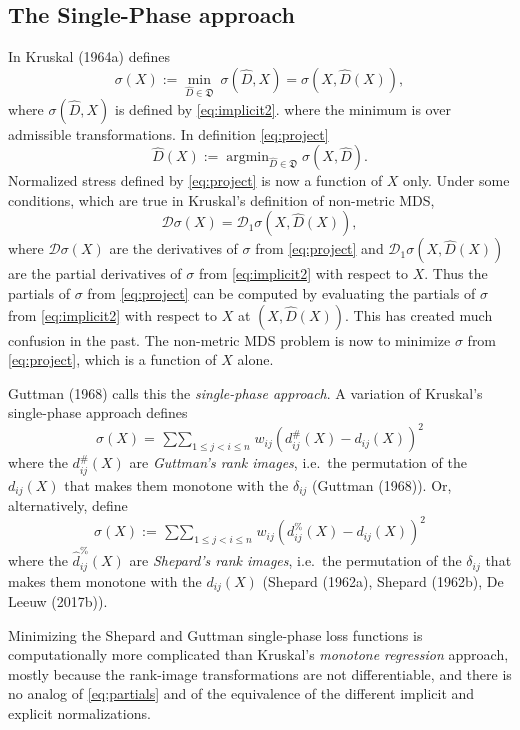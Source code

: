 \documentclass[
  12pt,
]{article}
\newcommand{\jis}{\mathop{\sum\sum}_{1\leq j<i\leq n}}
\begin{document}
\subsection{The Single-Phase approach}\label{the-single-phase-approach}

In Kruskal (1964a) defines
\begin{equation}
\sigma(X):=\min_{\hat D\in\mathfrak{D}}\ \sigma(\hat D,X)=\sigma(X,\hat D(X)),
\label{eq:project}
\end{equation}
where \(\sigma(\hat D,X)\) is defined by \eqref{eq:implicit2}.
where the minimum is over admissible transformations. In definition
\eqref{eq:project}
\begin{equation}
\hat D(X):=\mathop{\text{argmin}}_{\hat D\in\mathfrak{D}}\sigma(X, \hat D).
\label{eq:optscal}
\end{equation}
Normalized stress defined by \eqref{eq:project} is now a function of \(X\) only. Under some
conditions, which are true in Kruskal's definition of non-metric MDS,
\begin{equation}
\mathcal{D}\sigma(X)=\mathcal{D}_1\sigma(X,\hat D(X)),
\label{eq:partials}
\end{equation}
where \(\mathcal{D}\sigma(X)\) are the derivatives of \(\sigma\) from \eqref{eq:project} and \(\mathcal{D}_1\sigma(X,\hat D(X))\) are the partial derivatives of \(\sigma\) from \eqref{eq:implicit2} with respect to \(X\). Thus the partials of \(\sigma\) from \eqref{eq:project} can be computed by evaluating the partials of \(\sigma\) from \eqref{eq:implicit2} with respect to \(X\) at \((X,\hat D(X))\). This has created much confusion in the past. The non-metric MDS problem is now to minimize \(\sigma\) from \eqref{eq:project}, which is a function of \(X\) alone.

Guttman (1968) calls this the \emph{single-phase approach}. A variation of
Kruskal's single-phase approach defines
\[
\sigma(X)=\jis w_{ij}(d_{ij}^\#(X)-d_{ij}(X))^2
\]
where the \(d_{ij}^\#(X)\) are \emph{Guttman's rank images}, i.e.~the
permutation of the \(d_{ij}(X)\) that makes them monotone with the
\(\delta_{ij}\) (Guttman (1968)). Or, alternatively, define
\[
\sigma(X):=\jis w_{ij}(d_{ij}^\%(X)-d_{ij}(X))^2
\]
where the \(\hat d_{ij}^\%(X)\) are \emph{Shepard's rank images}, i.e.~the
permutation of the \(\delta_{ij}\) that makes them monotone with the
\(d_{ij}(X)\) (Shepard (1962a), Shepard (1962b), De Leeuw (2017b)).

Minimizing the Shepard and Guttman single-phase loss functions is
computationally more complicated than Kruskal's \emph{monotone regression}
approach, mostly because the rank-image transformations are not differentiable,
and there is no analog of \eqref{eq:partials} and of the equivalence of
the different implicit and explicit normalizations.
\end{document}
